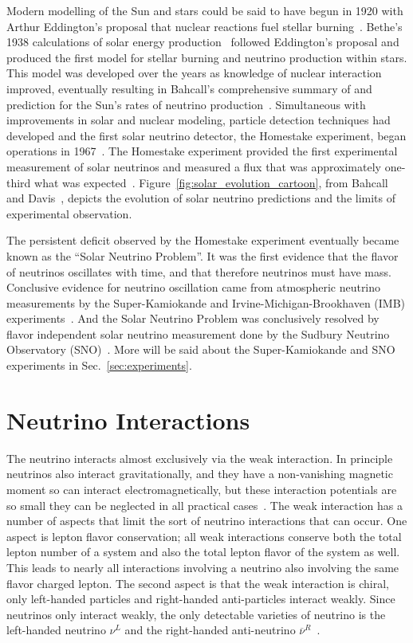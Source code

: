 Modern modelling of the Sun and stars could be said to have begun in 1920 with
Arthur Eddington's proposal that nuclear reactions fuel stellar burning~\citep{eddington}.
Bethe's 1938 calculations of solar energy production~\citep{bethe1, bethe2}
followed Eddington's proposal and produced the first model for stellar burning
and neutrino production within stars.
This model was developed over the years as knowledge of nuclear interaction
improved, eventually resulting in Bahcall's comprehensive summary of and
prediction for the Sun's rates of neutrino
production~\citep{bahcall_solar_neutrinos_theory}.
Simultaneous with improvements in solar and nuclear modeling,
particle detection techniques had developed and
the first solar neutrino detector, the Homestake experiment, began
operations in 1967~\citep{homestake_initial}.
The Homestake experiment provided the first experimental measurement
of solar neutrinos and measured a flux that was approximately one-third what was expected~\citep{homestake}.
Figure~\ref{fig:solar_evolution_cartoon}, from Bahcall and Davis~\citep{bahcall_evolution},
depicts the evolution of solar neutrino predictions and
the limits of experimental observation.

The persistent deficit observed by the Homestake experiment
eventually became known as the ``Solar Neutrino Problem''.
It was the first evidence that the flavor of neutrinos oscillates with
time, and that therefore neutrinos must have mass.
Conclusive evidence for neutrino oscillation came from  atmospheric neutrino
measurements by the Super-Kamiokande and Irvine-Michigan-Brookhaven (IMB)
experiments~\citep{superk_atmospherics, imb_atmospherics}.
And the Solar Neutrino Problem was conclusively resolved by flavor
independent solar neutrino measurement done
by the Sudbury Neutrino Observatory (SNO)~\citep{sno_first, sno_second, solar_nu_problem}.
More will be said about the Super-Kamiokande and SNO experiments in
Sec.~\ref{sec:experiments}.

\section{Neutrino Interactions}
\label{sec:neutrino_interactions}
The neutrino interacts almost exclusively via the weak interaction.
In principle neutrinos also interact gravitationally, and they have a non-vanishing
magnetic moment so can interact electromagnetically, but these
interaction potentials are so small they can be neglected in all practical
cases~\citep{neutrino_magmom}.
The weak interaction has a number of aspects that limit the sort of neutrino
interactions that can occur. One aspect is lepton flavor conservation;
all weak interactions conserve both the total lepton number of a system and also
the total lepton flavor of the system as well.
This leads to nearly all interactions involving a neutrino also involving the
same flavor charged lepton.
The second aspect is that the weak interaction is chiral,
only left-handed particles and right-handed anti-particles interact weakly.
Since neutrinos only interact weakly, the only detectable varieties of neutrino
is the left-handed neutrino $\nu^{L}$  and the right-handed
anti-neutrino $\overline{\nu}^{R}$~\citep{weinberg}.

